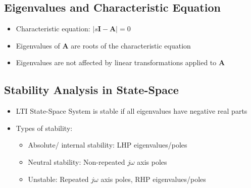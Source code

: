 \documentclass[a4paper]{article}
\begin{document}
\subsection{Eigenvalues and Characteristic Equation}
\begin{itemize}
    \item Characteristic equation: $|s\mathbf{I}-\mathbf{A}| = 0$
    \item Eigenvalues of $\mathbf{A}$ are roots of the characteristic equation
    \item Eigenvalues are not affected by linear transformations applied to $\mathbf{A}$
\end{itemize}

\newpage
\subsection{Stability Analysis in State-Space}
\begin{itemize}
    \item LTI State-Space System is stable if all eigenvalues have negative real parts
    \item Types of stability:
    \begin{itemize}[label=$\circ$]
        \item Absolute/ internal stability: LHP eigenvalues/poles
        \item Neutral stability: Non-repeated $j\omega$ axis poles
        \item Unstable: Repeated $j\omega$ axis poles, RHP eigenvalues/poles
    \end{itemize}
\end{itemize}

\newpage
\end{document}
